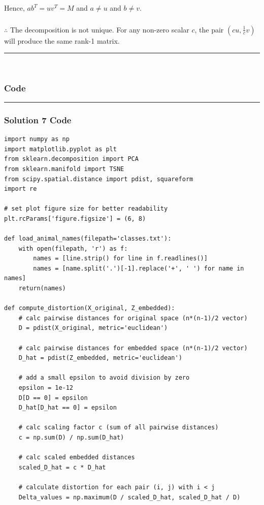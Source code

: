 \documentclass{article}
\begin{document}
{Hence, $a b^T = u v^T = M$ and $a \neq u$ and $b \neq v$.

\subsubsection*{\normalfont}{$\therefore$ The decomposition is not unique. For any non-zero scalar $c$, the pair $(cu, \frac{1}{c}v)$ will produce the same rank-1 matrix.}

\noindent\rule{\textwidth}{0.4pt}\\

\newpage

\subsubsection*{Code}
\noindent\rule{\textwidth}{0.4pt}
\subsubsection*{Solution 7 Code}
\begin{lstlisting}
import numpy as np
import matplotlib.pyplot as plt
from sklearn.decomposition import PCA
from sklearn.manifold import TSNE
from scipy.spatial.distance import pdist, squareform
import re 

# set plot figure size for better readability 
plt.rcParams['figure.figsize'] = (6, 8)

def load_animal_names(filepath='classes.txt'):
    with open(filepath, 'r') as f:
        names = [line.strip() for line in f.readlines()]
        names = [name.split('.')[-1].replace('+', ' ') for name in names]
    return(names)

def compute_distortion(X_original, Z_embedded):
    # calc pairwise distances for original space (n*(n-1)/2 vector)
    D = pdist(X_original, metric='euclidean')

    # calc pairwise distances for embedded space (n*(n-1)/2 vector)
    D_hat = pdist(Z_embedded, metric='euclidean')
    
    # add a small epsilon to avoid division by zero
    epsilon = 1e-12
    D[D == 0] = epsilon
    D_hat[D_hat == 0] = epsilon
    
    # calc scaling factor c (sum of all pairwise distances)
    c = np.sum(D) / np.sum(D_hat)
    
    # calc scaled embedded distances
    scaled_D_hat = c * D_hat
    
    # calculate distortion for each pair (i, j) with i < j
    Delta_values = np.maximum(D / scaled_D_hat, scaled_D_hat / D)
    

\end{lstlisting}}
\end{document}
